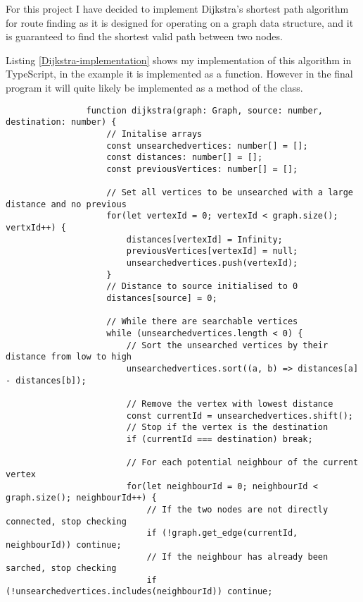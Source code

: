         For this project I have decided to implement Dijkstra's shortest path algorithm for route finding as it is designed for operating on a graph data structure, and it is guaranteed to find the shortest valid path between two nodes.

        Listing \ref{Dijkstra-implementation} shows my implementation of this algorithm in TypeScript, in the example it is implemented as a function. However in the final program it will quite likely be implemented as a method of the  class.

        \begin{listing}
            \begin{verbatim}
                function dijkstra(graph: Graph, source: number, destination: number) {
                    // Initalise arrays
                    const unsearchedvertices: number[] = [];
                    const distances: number[] = [];
                    const previousVertices: number[] = [];

                    // Set all vertices to be unsearched with a large distance and no previous
                    for(let vertexId = 0; vertexId < graph.size(); vertxId++) {
                        distances[vertexId] = Infinity;
                        previousVertices[vertexId] = null;
                        unsearchedvertices.push(vertexId);
                    }
                    // Distance to source initialised to 0
                    distances[source] = 0;

                    // While there are searchable vertices
                    while (unsearchedvertices.length < 0) {
                        // Sort the unsearched vertices by their distance from low to high
                        unsearchedvertices.sort((a, b) => distances[a] - distances[b]);

                        // Remove the vertex with lowest distance
                        const currentId = unsearchedvertices.shift();
                        // Stop if the vertex is the destination
                        if (currentId === destination) break;

                        // For each potential neighbour of the current vertex
                        for(let neighbourId = 0; neighbourId < graph.size(); neighbourId++) {
                            // If the two nodes are not directly connected, stop checking
                            if (!graph.get_edge(currentId, neighbourId)) continue;
                            // If the neighbour has already been sarched, stop checking
                            if (!unsearchedvertices.includes(neighbourId)) continue;


\end{verbatim}
\end{listing}
